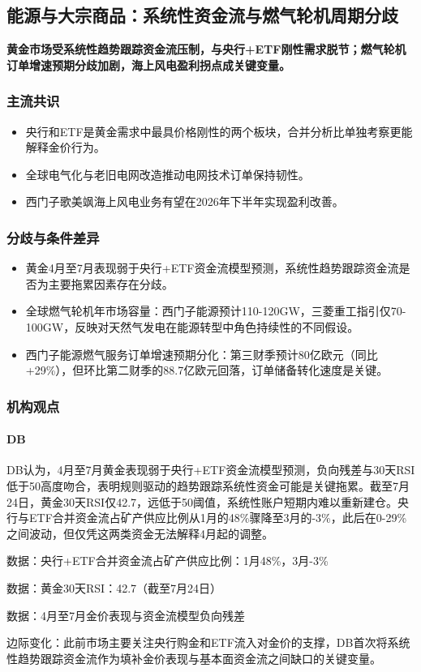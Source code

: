 \documentclass[11pt]{ctexart}
\begin{document}
\subsection{能源与大宗商品：系统性资金流与燃气轮机周期分歧}
\textbf{黄金市场受系统性趋势跟踪资金流压制，与央行+ETF刚性需求脱节；燃气轮机订单增速预期分歧加剧，海上风电盈利拐点成关键变量。}
\subsubsection*{主流共识}
\begin{itemize}
  \item 央行和ETF是黄金需求中最具价格刚性的两个板块，合并分析比单独考察更能解释金价行为。
  \item 全球电气化与老旧电网改造推动电网技术订单保持韧性。
  \item 西门子歌美飒海上风电业务有望在2026年下半年实现盈利改善。
\end{itemize}
\subsubsection*{分歧与条件差异}
\begin{itemize}
  \item 黄金4月至7月表现弱于央行+ETF资金流模型预测，系统性趋势跟踪资金流是否为主要拖累因素存在分歧。
  \item 全球燃气轮机年市场容量：西门子能源预计110-120GW，三菱重工指引仅70-100GW，反映对天然气发电在能源转型中角色持续性的不同假设。
  \item 西门子能源燃气服务订单增速预期分化：第三财季预计80亿欧元（同比+29\%），但环比第二财季的88.7亿欧元回落，订单储备转化速度是关键。
\end{itemize}
\subsubsection*{机构观点}
\paragraph{DB} DB认为，4月至7月黄金表现弱于央行+ETF资金流模型预测，负向残差与30天RSI低于50高度吻合，表明规则驱动的趋势跟踪系统性资金可能是关键拖累。截至7月24日，黄金30天RSI仅42.7，远低于50阈值，系统性账户短期内难以重新建仓。央行与ETF合并资金流占矿产供应比例从1月的48\%骤降至3月的-3\%，此后在0-29\%之间波动，但仅凭这两类资金无法解释4月起的调整。
{\small\color{refgray}数据：央行+ETF合并资金流占矿产供应比例：1月48\%，3月-3\%\par}
{\small\color{refgray}数据：黄金30天RSI：42.7（截至7月24日）\par}
{\small\color{refgray}数据：4月至7月金价表现与资金流模型负向残差\par}
{\small\color{refgray}边际变化：此前市场主要关注央行购金和ETF流入对金价的支撑，DB首次将系统性趋势跟踪资金流作为填补金价表现与基本面资金流之间缺口的关键变量。\par}
\end{document}
